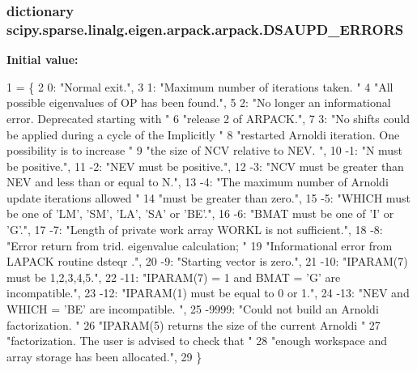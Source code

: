 \subsubsection[{D\+S\+A\+U\+P\+D\+\_\+\+E\+R\+R\+O\+R\+S}]{\setlength{\rightskip}{0pt plus 5cm}dictionary scipy.\+sparse.\+linalg.\+eigen.\+arpack.\+arpack.\+D\+S\+A\+U\+P\+D\+\_\+\+E\+R\+R\+O\+R\+S}\label{namespacescipy_1_1sparse_1_1linalg_1_1eigen_1_1arpack_1_1arpack_adf9bcdbc9991ef550abf43a51d8b8ef6}
{\bfseries Initial value\+:}
\begin{DoxyCode}
1 = \{
2     0: \textcolor{stringliteral}{"Normal exit."},
3     1: \textcolor{stringliteral}{"Maximum number of iterations taken. "}
4        \textcolor{stringliteral}{"All possible eigenvalues of OP has been found."},
5     2: \textcolor{stringliteral}{"No longer an informational error. Deprecated starting with "}
6        \textcolor{stringliteral}{"release 2 of ARPACK."},
7     3: \textcolor{stringliteral}{"No shifts could be applied during a cycle of the Implicitly "}
8        \textcolor{stringliteral}{"restarted Arnoldi iteration. One possibility is to increase "}
9        \textcolor{stringliteral}{"the size of NCV relative to NEV. "},
10     -1: \textcolor{stringliteral}{"N must be positive."},
11     -2: \textcolor{stringliteral}{"NEV must be positive."},
12     -3: \textcolor{stringliteral}{"NCV must be greater than NEV and less than or equal to N."},
13     -4: \textcolor{stringliteral}{"The maximum number of Arnoldi update iterations allowed "}
14         \textcolor{stringliteral}{"must be greater than zero."},
15     -5: \textcolor{stringliteral}{"WHICH must be one of 'LM', 'SM', 'LA', 'SA' or 'BE'."},
16     -6: \textcolor{stringliteral}{"BMAT must be one of 'I' or 'G'."},
17     -7: \textcolor{stringliteral}{"Length of private work array WORKL is not sufficient."},
18     -8: \textcolor{stringliteral}{"Error return from trid. eigenvalue calculation; "}
19         \textcolor{stringliteral}{"Informational error from LAPACK routine dsteqr ."},
20     -9: \textcolor{stringliteral}{"Starting vector is zero."},
21     -10: \textcolor{stringliteral}{"IPARAM(7) must be 1,2,3,4,5."},
22     -11: \textcolor{stringliteral}{"IPARAM(7) = 1 and BMAT = 'G' are incompatible."},
23     -12: \textcolor{stringliteral}{"IPARAM(1) must be equal to 0 or 1."},
24     -13: \textcolor{stringliteral}{"NEV and WHICH = 'BE' are incompatible. "},
25     -9999: \textcolor{stringliteral}{"Could not build an Arnoldi factorization. "}
26            \textcolor{stringliteral}{"IPARAM(5) returns the size of the current Arnoldi "}
27            \textcolor{stringliteral}{"factorization. The user is advised to check that "}
28            \textcolor{stringliteral}{"enough workspace and array storage has been allocated."},
29 \}
\end{DoxyCode}
\hypertarget{namespacescipy_1_1sparse_1_1linalg_1_1eigen_1_1arpack_1_1arpack_a471a37fcb4c527bdcac4225e6dfd810e}{}
